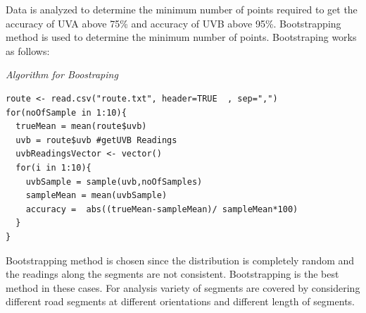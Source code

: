 \documentclass[12pt,fullpage,doublespace]{article}
\begin{document}
Data is analyzed to determine the minimum number of points required to get the accuracy of UVA above 75\% and accuracy of UVB above 95\%. Bootstrapping method is used to determine the minimum number of points. Bootstraping works as follows:
\\
\begin{center}
{ 	

\begin{center} 
{\small \sl Algorithm for Boostraping \\}
\end{center} 
}
\end{center}
\newpage
\lstset{caption=R Code for Bootstraping,breaklines=true, tabsize=4, frame=single}
\begin{lstlisting}
route <- read.csv("route.txt", header=TRUE  , sep=",")
for(noOfSample in 1:10){  
  trueMean = mean(route$uvb)
  uvb = route$uvb #getUVB Readings
  uvbReadingsVector <- vector()
  for(i in 1:10){
    uvbSample = sample(uvb,noOfSamples)
    sampleMean = mean(uvbSample)
    accuracy =  abs((trueMean-sampleMean)/ sampleMean*100)
  }
}\end{lstlisting}

Bootstrapping method is chosen since the distribution is completely random and the readings along the segments are not consistent. Bootstrapping is the best method in these cases. For analysis variety of segments are covered by considering different road segments at different orientations and different length of segments. 
\end{document}
